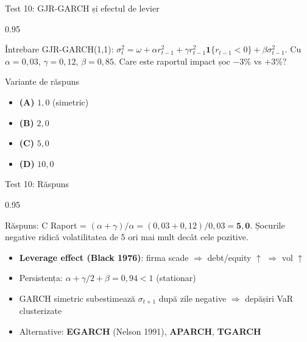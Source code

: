 \documentclass[9pt, aspectratio=169, t]{beamer}
\begin{document}
\begin{frame}[shrink=10]{Test 10: GJR-GARCH și efectul de levier}
    \begin{cminipage}{0.95\textwidth}
    \begin{alertblock}{Întrebare}
    GJR-GARCH(1,1): $\sigma^2_t = \omega + \alpha r^2_{t-1} + \gamma r^2_{t-1}\mathbf{1}\{r_{t-1}<0\} + \beta\sigma^2_{t-1}$. Cu $\alpha = 0{,}03$, $\gamma = 0{,}12$, $\beta = 0{,}85$. Care este raportul impact șoc $-3\%$ vs $+3\%$?
    \end{alertblock}
    \begin{block}{Variante de răspuns}
    \begin{itemize}\setlength{\itemsep}{0pt}
        \item \textbf{(A)} $1{,}0$ (simetric)
        \item \textbf{(B)} $2{,}0$
        \item \textbf{(C)} $5{,}0$
        \item \textbf{(D)} $10{,}0$
    \end{itemize}
    \end{block}
    \end{cminipage}
\end{frame}

\begin{frame}[shrink=10]{Test 10: Răspuns}
    \begin{cminipage}{0.95\textwidth}
    \begin{exampleblock}{Răspuns: C}
    Raport = $(\alpha + \gamma)/\alpha = (0{,}03 + 0{,}12)/0{,}03 = \mathbf{5{,}0}$. Șocurile negative ridică volatilitatea de 5 ori mai mult decât cele pozitive.
    \end{exampleblock}
    \begin{itemize}\setlength{\itemsep}{0pt}
        \item \textbf{Leverage effect (Black 1976)}: firma scade $\Rightarrow$ debt/equity $\uparrow$ $\Rightarrow$ vol $\uparrow$
        \item Persistența: $\alpha + \gamma/2 + \beta = 0{,}94 < 1$ (stationar)
        \item GARCH simetric subestimează $\sigma_{t+1}$ după zile negative $\Rightarrow$ depășiri VaR clusterizate
        \item Alternative: \textbf{EGARCH} (Nelson 1991), \textbf{APARCH}, \textbf{TGARCH}
    \end{itemize}
    \end{cminipage}
\end{frame}
\end{document}
